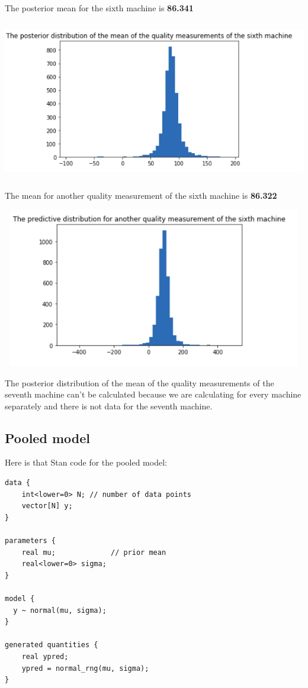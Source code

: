 \documentclass[17pt]{article}
\begin{document}
The posterior mean for the sixth machine is \textbf{86.341}\\
\begin{center}
\includegraphics[width=15cm, height=7cm]{mean_separate.png}
\end{center}

\newpage

The mean for another quality measurement of the sixth machine is \textbf{86.322}
\begin{center}
\includegraphics[width=15cm, height=7cm]{next_separate.png}
\end{center}

The posterior distribution of the mean of the quality measurements of the seventh machine can't be calculated because we are calculating for every machine separately and there is not data for the seventh machine.

\subsection{Pooled model}
Here is that Stan code for the pooled model:
\begin{lstlisting}
data {
    int<lower=0> N; // number of data points
    vector[N] y;
}

parameters {
    real mu;             // prior mean
    real<lower=0> sigma;
}

model {
  y ~ normal(mu, sigma);
}

generated quantities {
    real ypred;
    ypred = normal_rng(mu, sigma);
}
\end{lstlisting}
\end{document}
